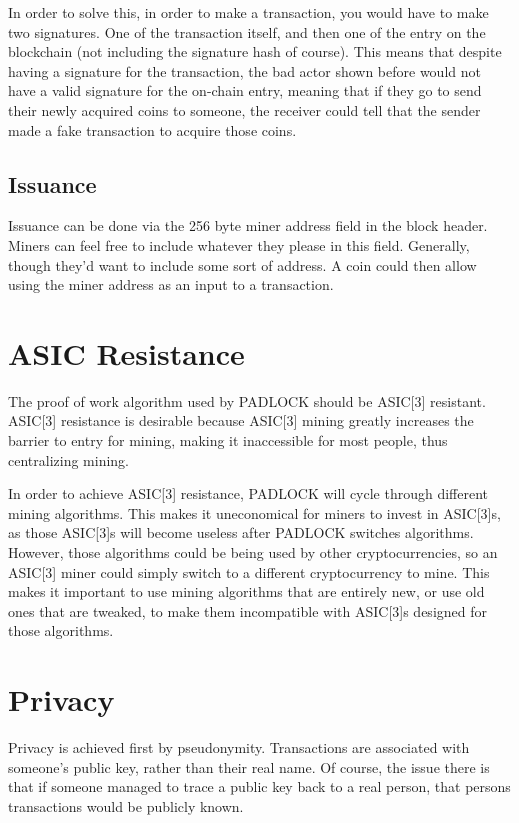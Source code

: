 \documentclass[12pt, letterpaper]{article}
\begin{document}
In order to solve this, in order to make a transaction, you would have to make
two signatures. One of the transaction itself, and then one of the entry on the
blockchain (not including the signature hash of course). This means that
despite having a signature for the transaction, the bad actor shown before would
not have a valid signature for the on-chain entry, meaning that if they go to
send their newly acquired coins to someone, the receiver could tell that the
sender made a fake transaction to acquire those coins.

\subsection{Issuance}
Issuance can be done via the 256 byte miner address field in the block header.
Miners can feel free to include whatever they please in this field. Generally,
though they'd want to include some sort of address. A coin could then allow
using the miner address as an input to a transaction.


\section{ASIC Resistance}
The proof of work algorithm used by PADLOCK should be ASIC[3] resistant. 
ASIC[3] resistance is desirable because ASIC[3] mining greatly increases the 
barrier to entry for mining, making it inaccessible for
most people, thus centralizing mining.

In order to achieve ASIC[3] resistance, PADLOCK will cycle through different mining
algorithms. This makes it uneconomical for miners to invest in ASIC[3]s, as those
ASIC[3]s will become useless after PADLOCK switches algorithms. However, those
algorithms could be being used by other cryptocurrencies, so an ASIC[3] miner could
simply switch to a different cryptocurrency to mine. This makes it important to
use mining algorithms that are entirely new, or use old ones that are tweaked,
to make them incompatible with ASIC[3]s designed for those algorithms.


\section{Privacy}
Privacy is achieved first by pseudonymity. Transactions are associated with
someone's public key, rather than their real name. Of course, the issue there is
that if someone managed to trace a public key back to a real person, that
persons transactions would be publicly known.
\end{document}
